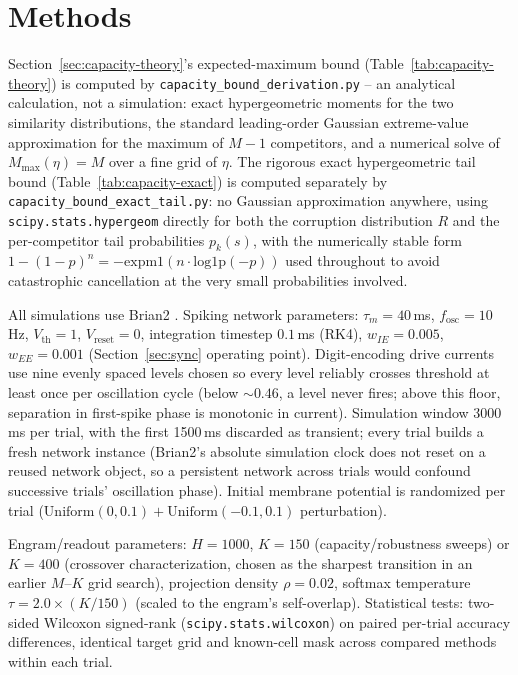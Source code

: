 \documentclass[11pt]{article}
\begin{document}
\section{Methods}

Section~\ref{sec:capacity-theory}'s expected-maximum bound (Table~\ref{tab:capacity-theory}) is
computed by \texttt{capacity\_bound\_derivation.py} -- an analytical calculation, not a
simulation: exact hypergeometric moments for the two similarity distributions, the standard
leading-order Gaussian extreme-value approximation for the maximum of $M{-}1$ competitors, and
a numerical solve of $M_{\max}(\eta)=M$ over a fine grid of $\eta$. The rigorous exact
hypergeometric tail bound (Table~\ref{tab:capacity-exact}) is computed separately by
\texttt{capacity\_bound\_exact\_tail.py}: no Gaussian approximation anywhere, using
\texttt{scipy.stats.hypergeom} directly for both the corruption distribution $R$ and the
per-competitor tail probabilities $p_k(s)$, with the numerically stable form
$1-(1-p)^n=-\mathrm{expm1}(n\cdot\mathrm{log1p}(-p))$ used throughout to avoid catastrophic
cancellation at the very small probabilities involved.

All simulations use Brian2 \cite{brian2}. Spiking network parameters: $\tau_m=40$\,ms,
$f_{\mathrm{osc}}=10$\,Hz, $V_{\mathrm{th}}=1$, $V_{\mathrm{reset}}=0$, integration timestep
$0.1$\,ms (RK4), $w_{IE}=0.005$, $w_{EE}=0.001$ (Section~\ref{sec:sync} operating point).
Digit-encoding drive currents use nine evenly spaced levels chosen so every level reliably
crosses threshold at least once per oscillation cycle (below ${\sim}0.46$, a level never
fires; above this floor, separation in first-spike phase is monotonic in current). Simulation
window 3000\,ms per trial, with the first 1500\,ms discarded as transient; every trial builds
a fresh network instance (Brian2's absolute simulation clock does not reset on a reused
network object, so a persistent network across trials would confound successive trials'
oscillation phase). Initial membrane potential is randomized per trial
($\mathrm{Uniform}(0,0.1) + \mathrm{Uniform}(-0.1,0.1)$ perturbation).

Engram/readout parameters: $H=1000$, $K=150$ (capacity/robustness sweeps) or $K=400$
(crossover characterization, chosen as the sharpest transition in an earlier $M$--$K$ grid
search), projection density $\rho=0.02$, softmax temperature $\tau=2.0\times(K/150)$ (scaled
to the engram's self-overlap). Statistical tests: two-sided Wilcoxon signed-rank
(\texttt{scipy.stats.wilcoxon}) on paired per-trial accuracy differences, identical target
grid and known-cell mask across compared methods within each trial.
\end{document}
